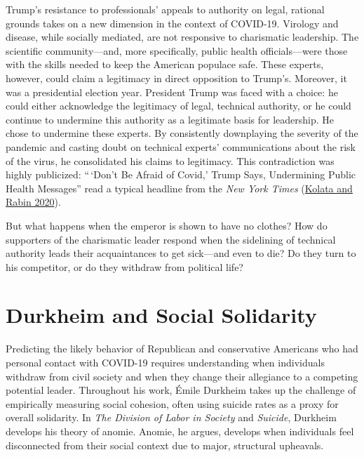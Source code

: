 \documentclass[
  12pt,
]{article}
\begin{document}
Trump's resistance to professionals' appeals to authority on legal, rational grounds takes on a new dimension in the context of COVID-19. Virology and disease, while socially mediated, are not responsive to charismatic leadership. The scientific community---and, more specifically, public health officials---were those with the skills needed to keep the American populace safe. These experts, however, could claim a legitimacy in direct opposition to Trump's. Moreover, it was a presidential election year. President Trump was faced with a choice: he could either acknowledge the legitimacy of legal, technical authority, or he could continue to undermine this authority as a legitimate basis for leadership. He chose to undermine these experts. By consistently downplaying the severity of the pandemic and casting doubt on technical experts' communications about the risk of the virus, he consolidated his claims to legitimacy. This contradiction was highly publicized: ``\,`Don't Be Afraid of Covid,' Trump Says, Undermining Public Health Messages'' read a typical headline from the \emph{New York Times} (\protect\hyperlink{ref-Kolata2020}{Kolata and Rabin 2020}).

But what happens when the emperor is shown to have no clothes? How do supporters of the charismatic leader respond when the sidelining of technical authority leads their acquaintances to get sick---and even to die? Do they turn to his competitor, or do they withdraw from political life?

\hypertarget{durkheim-and-social-solidarity}{%
\section*{Durkheim and Social Solidarity}\label{durkheim-and-social-solidarity}}

Predicting the likely behavior of Republican and conservative Americans who had personal contact with COVID-19 requires understanding when individuals withdraw from civil society and when they change their allegiance to a competing potential leader. Throughout his work, Émile Durkheim takes up the challenge of empirically measuring social cohesion, often using suicide rates as a proxy for overall solidarity. In \emph{The Division of Labor in Society} and \emph{Suicide}, Durkheim develops his theory of anomie. Anomie, he argues, develops when individuals feel disconnected from their social context due to major, structural upheavals.
\end{document}
